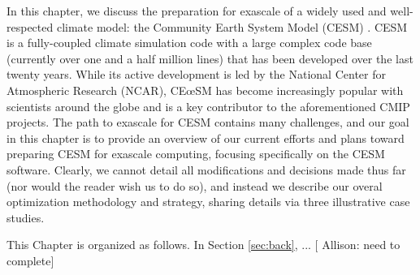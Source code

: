 In this chapter, we discuss the preparation for exascale of a widely used and well-respected climate model: the Community Earth System Model (CESM) \cite{cesm2013}.  CESM is a fully-coupled climate simulation code with a large complex code base (currently over one and a half million lines) that has been developed over the last twenty years.  While its active development is led by the National Center for Atmospheric Research (NCAR), CEœSM has become increasingly popular with scientists around the globe and is a key contributor to the aforementioned CMIP projects. 
The path to exascale for CESM contains many challenges, and our goal in this chapter is to provide an overview of our current efforts and plans toward preparing CESM for exascale computing, focusing specifically on the CESM software. Clearly, we cannot detail all modifications and decisions made thus far (nor would the reader wish us to do so), and instead we describe our overal optimization methodology and strategy, sharing details via three illustrative case studies.

This Chapter is organized as follows. In Section \ref{sec:back}, ... [{\color{red} Allison:} need to complete]
